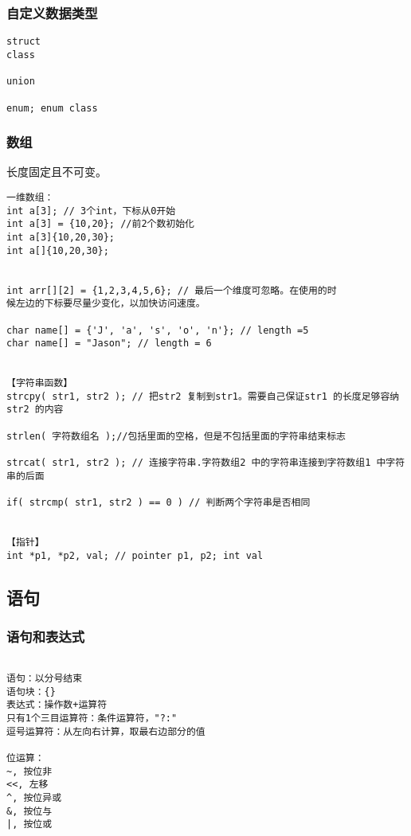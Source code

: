 \documentclass[UTF8]{../computerUniverse}
\begin{document}
\subsubsection{自定义数据类型}

\begin{lstlisting}
struct
class

union

enum; enum class

\end{lstlisting}



\subsubsection{数组}

长度固定且不可变。
\begin{lstlisting}
一维数组：
int a[3]; // 3个int，下标从0开始
int a[3] = {10,20}; //前2个数初始化
int a[3]{10,20,30};
int a[]{10,20,30};


int arr[][2] = {1,2,3,4,5,6}; // 最后一个维度可忽略。在使用的时
候左边的下标要尽量少变化，以加快访问速度。

char name[] = {'J', 'a', 's', 'o', 'n'}; // length =5
char name[] = "Jason"; // length = 6


【字符串函数】
strcpy( str1, str2 ); // 把str2 复制到str1。需要自己保证str1 的长度足够容纳str2 的内容

strlen( 字符数组名 );//包括里面的空格，但是不包括里面的字符串结束标志

strcat( str1, str2 ); // 连接字符串.字符数组2 中的字符串连接到字符数组1 中字符串的后面

if( strcmp( str1, str2 ) == 0 ) // 判断两个字符串是否相同


【指针】
int *p1, *p2, val; // pointer p1, p2; int val

\end{lstlisting}


\subsection{语句}

\subsubsection{语句和表达式}

\begin{lstlisting}

语句：以分号结束
语句块：{}
表达式：操作数+运算符
只有1个三目运算符：条件运算符，"?:"
逗号运算符：从左向右计算，取最右边部分的值

位运算：
~, 按位非
<<, 左移
^, 按位异或
&, 按位与
|, 按位或

\end{lstlisting}
\end{document}
